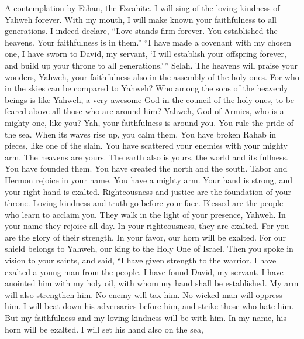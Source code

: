 A contemplation by Ethan, the Ezrahite.  I will sing of the
loving kindness of Yahweh forever. With my mouth, I will make known your
faithfulness to all generations.  I indeed declare, ``Love
stands firm forever. You established the heavens. Your faithfulness is
in them.''  ``I have made a covenant with my chosen one, I
have sworn to David, my servant,  `I will establish your
offspring forever, and build up your throne to all generations.'\,''
Selah.  The heavens will praise your wonders, Yahweh, your
faithfulness also in the assembly of the holy ones.  For who
in the skies can be compared to Yahweh? Who among the sons of the
heavenly beings is like Yahweh,  a very awesome God in the
council of the holy ones, to be feared above all those who are around
him?  Yahweh, God of Armies, who is a mighty one, like you?
Yah, your faithfulness is around you.  You rule the pride of
the sea. When its waves rise up, you calm them.  You have
broken Rahab in pieces, like one of the slain. You have scattered your
enemies with your mighty arm.  The heavens are yours. The
earth also is yours, the world and its fullness. You have founded them.
 You have created the north and the south. Tabor and Hermon
rejoice in your name.  You have a mighty arm. Your hand is
strong, and your right hand is exalted.  Righteousness and
justice are the foundation of your throne. Loving kindness and truth go
before your face.  Blessed are the people who learn to
acclaim you. They walk in the light of your presence, Yahweh.
 In your name they rejoice all day. In your righteousness,
they are exalted.  For you are the glory of their strength.
In your favor, our horn will be exalted.  For our shield
belongs to Yahweh, our king to the Holy One of Israel. 
Then you spoke in vision to your saints, and said, ``I have given
strength to the warrior. I have exalted a young man from the people.
 I have found David, my servant. I have anointed him with
my holy oil,  with whom my hand shall be established. My
arm will also strengthen him.  No enemy will tax him. No
wicked man will oppress him.  I will beat down his
adversaries before him, and strike those who hate him.  But
my faithfulness and my loving kindness will be with him. In my name, his
horn will be exalted.  I will set his hand also on the sea,
